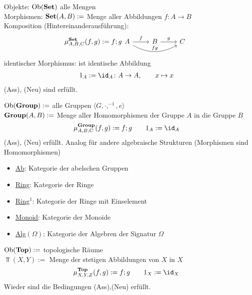 \begin{beispiel}%
	\label{def:set}
	Objekte: $\operatorname{Ob}(\operatorname{\mathbf{Set}})$ alle Mengen\\
	Morphismen: $\operatorname{\mathbf{Set}}(A,B):=$ Menge aller Abbildungen $f\colon A\to B$\\
	Komposition (Hintereinanderausführung):
	$$
		\mu_{A,B,C}^{\Set}(f,g):=f;g\\
		\begin{tikzcd}[ampersand replacement=\&]
			A \arrow{r}{f} \arrow[bend right]{rr}{fg} \& B \arrow{r}{g} \& C
	  	\end{tikzcd}
	$$
	identischer Morphismus: ist identische Abbildung
	\begin{align*}
		1_A:=\id_A\colon A\to A,\qquad x\mapsto x
	\end{align*}
	(Ass), (Neu) sind erfüllt.
\end{beispiel}


\begin{beispiel}
	$\operatorname{Ob}(\operatorname{\mathbf{Group}}):=$ alle Gruppen $\langle G,\cdot,^{-1},e\rangle$\\
	$\operatorname{\mathbf{Group}}(A,B):=$ Menge aller Homomorphismen der Gruppe $A$ in die Gruppe $B$
	\begin{align*}
		\mu_{A,B,C}^{\Group}(f,g):=f;g\qquad 1_A:=\id_A
	\end{align*}
	(Ass), (Neu) erfüllt.\nl
	Analog für andere algebraische Strukturen (Morphismen sind Homomorphismen)
	\begin{itemize}
		\item \ul{Ab}: Kategorie der abelschen Gruppen
		\item \ul{Ring}: Kategorie der Ringe
		\item \ul{Ring$^1$}: Kategorie der Ringe mit Einselement
		\item \ul{Monoid}: Kategorie der Monoide
		\item \ul{Alg$(\Omega)$}: Kategorie der Algebren der Signatur $\Omega$
	\end{itemize}
\end{beispiel}

\setcounter{satz}{4}

\begin{beispiel}[\ul{Top}]\label{beisp1.5Top}\enter
	$\operatorname{Ob}(\operatorname{\mathbf{Top}}):=$ topologische Räume\\
	$\Top(X,Y):=$ Menge der stetigen Abbildungen von $X$ in $X$
	\begin{align*}
		\mu_{X,Y,Z}^{\Top}(f,g):=f;g\qquad
		1_X:=\id_X
	\end{align*}
	Wieder sind die Bedingungen (Ass),(Neu) erfüllt.
\end{beispiel}


